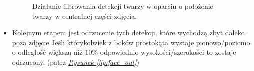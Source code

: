 \begin{itemize}
\begin{figure}[!h]
\begin{center}
        \end{center}
        \caption{Działanie filtrowania detekcji twarzy w oparciu o położenie twarzy w centralnej części zdjęcia.}
        \label{fig:face_boundary}
    \end{figure}
    
    \item Kolejnym etapem jest odrzucenie tych detekcji, które wychodzą zbyt daleko poza zdjęcie Jeśli którykolwiek z boków prostokąta wystaje pionowo/poziomo o odległość większą niż $10\%$ odpowiednio wysokości/szerokości to zostaje odrzucony. (patrz \hyperref[{fig:face_out}]{\textit{Rysunek \ref{fig:face_out}}})
    

\end{itemize}
